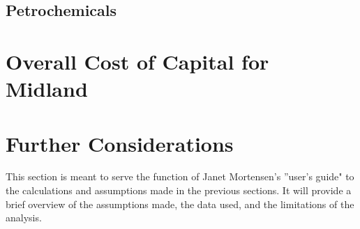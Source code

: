 \documentclass{article}
\begin{document}
\subsection{Petrochemicals}

\hrulefill
\section{Overall Cost of Capital for Midland}

\hrulefill
\section{Further Considerations}
This section is meant to serve the function of Janet Mortensen's ''user's guide" to the calculations and assumptions made in the previous sections. It will provide a brief overview of the assumptions made, the data used, and the limitations of the analysis.
\end{document}
